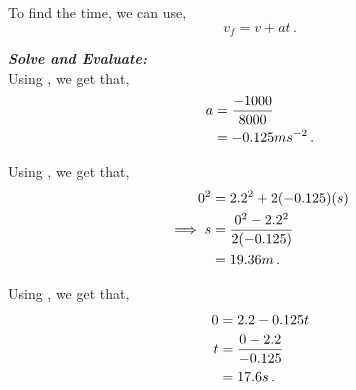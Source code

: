 \begin{subquestions}
\begin{subsubquestions}
To find the time, we can use,
\begin{equation}
	v_f = v+at \label{2008J:q5:TEqn1} \,.
\end{equation}




\textbf{\textit{Solve and Evaluate:}} \\
Using , we get that,
\begin{align}
	a & = \frac{-1000}{8000} \nonumber \\
	  & = -0.125ms^{-2} \,. 
\end{align}

Using , we get that,
\begin{align}
	0^2 & = 2.2^2 + 2(-0.125)(s) \nonumber \\
	\implies s & = \frac{0^2-2.2^2}{2(-0.125)} \nonumber \\
	  & = 19.36m \,.
\end{align}

Using , we get that,
\begin{align}
	0 & = 2.2 - 0.125t \nonumber \\
	t & = \frac{0-2.2}{-0.125} \nonumber \\
	  & = 17.6s \,.
\end{align}

\end{subsubquestions}
	
\end{subquestions}